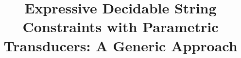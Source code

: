 \documentclass{llncs}
\newcommand\shortlong[2]{#2}
\newcommand{\zhilin}[1]{\color{brown} {ZL: #1 :LZ} \color{black}}
\newcommand{\zhilin}[1]{}
\begin{document}
\title{Expressive Decidable String Constraints with Parametric Transducers: A Generic Approach}

\author{}
\institute{}

\maketitle


















\newpage




\shortlong{}{
    \newpage

    \appendix
    
    
    
    
    
    
}
\end{document}
